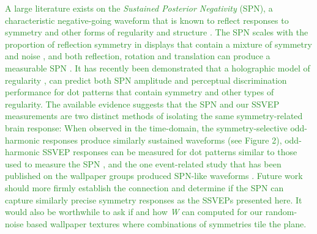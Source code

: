\documentclass[11pt, twoside]{article}
\begin{document}
\textcolor{ForestGreen}{A large literature exists on the \textit{Sustained Posterior Negativity} (SPN), a characteristic negative-going waveform that is known to reflect responses to symmetry and other forms of regularity and structure \citep{makin_2016}. The SPN scales with the proportion of reflection symmetry in displays that contain a mixture of symmetry and noise \cite{makin_formation_2020, palumbo_scaling_2015}, and both reflection, rotation and translation can produce a measurable SPN \cite{makin_2013}. It has recently been demonstrated that a holographic model of regularity \citep{van_der_helm_1996}, can predict both SPN amplitude \citep{makin_2016} and perceptual discrimination performance \citep{nucci_2007} for dot patterns that contain symmetry and other types of regularity. The available evidence suggests that the SPN and our SSVEP measurements are two distinct methods of isolating the same symmetry-related brain response: When observed in the time-domain, the symmetry-selective odd-harmonic responses produce similarly sustained waveforms (see Figure 2), odd-harmonic SSVEP responses can be measured for dot patterns similar to those used to measure the SPN \citep{RN1954}, and the one event-related study that has been published on the wallpaper groups produced SPN-like waveforms \citep{RN1959}. Future work should more firmly establish the connection and determine if the SPN can capture similarly precise symmetry responses as the SSVEPs presented here. It would also be worthwhile to ask if and how \textit{W} can computed for our random-noise based wallpaper textures where combinations of symmetries tile the plane.}    
\end{document}
